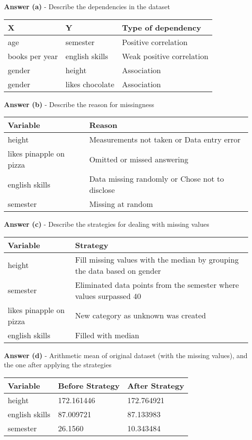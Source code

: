 \documentclass[a4paper,10pt]{article}\setlength{\textheight}{10in}\setlength{\textwidth}{6.5in}\setlength{\topmargin}{-0.125in}\setlength{\oddsidemargin}{-.2in}\setlength{\evensidemargin}{-.2in}\setlength{\headsep}{0.2in}\setlength{\footskip}{0pt}\usepackage{amsmath}\usepackage{fancyhdr}\usepackage{enumitem}\usepackage{hyperref}\usepackage{xcolor}\usepackage{graphicx}\usepackage[export]{adjustbox}\usepackage{caption}\usepackage{float}\usepackage{booktabs}\usepackage{makecell}\pagestyle{fancy}
\begin{document}
\begin{enumerate}[topsep=0mm, partopsep=0mm, leftmargin=*]
\textbf{Answer (a)} - Describe the dependencies in the dataset
\begin{center}
\begin{tabular}{lll}
\toprule
\textbf{X} & \textbf{Y} & \textbf{Type of dependency} \\ \midrule
age & semester & Positive correlation \\
books per year & english skills & Weak positive correlation \\
gender & height & Association \\
gender & likes chocolate & Association \\
\bottomrule
\end{tabular}
\end{center}

\textbf{Answer (b)} - Describe the reason for missingness
\begin{center}
\begin{tabular}{ll}
\toprule
\textbf{Variable} & \textbf{Reason} \\ \midrule
height & Measurements not taken or Data entry error \\
likes pinapple on pizza  & Omitted or missed answering \\
english skills & Data missing randomly or Chose not to disclose  \\
semester & Missing at random \\
\bottomrule
\end{tabular}
\end{center}

\textbf{Answer (c)} - Describe the strategies for dealing with missing values
\begin{center}
\begin{tabular}{ll}
\toprule
\textbf{Variable} & \textbf{Strategy} \\ \midrule
height & Fill missing values with the median by grouping the data based on gender \\
semester & Eliminated data points from the semester where values surpassed 40 \\
likes pinapple on pizza  & New category as unknown was created \\
english skills & Filled with median \\

\bottomrule
\end{tabular}
\end{center}

\textbf{Answer (d)} - Arithmetic mean of original dataset (with the missing values), and the one after applying the strategies
\begin{center}
\begin{tabular}{lll}
\toprule
\textbf{Variable} & \textbf{Before Strategy} & \textbf{After Strategy} \\ \midrule
height & 172.161446 & 172.764921 \\
english skills & 87.009721 & 87.133983 \\
semester & 26.1560 & 10.343484 \\
\bottomrule
\end{tabular}
\end{center}

\end{enumerate}
\end{document}

